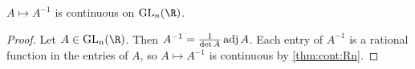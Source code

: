 \begin{proposition*} \label{thm:inv-cont}
    $A \mapsto A^{-1}$ is continuous on $\GL_n(\R)$.
\end{proposition*}
\begin{proof}
    Let $A \in \GL_n(\R)$.
    Then $A^{-1} = \frac1{\det A} \operatorname{adj} A$.
    Each entry of $A^{-1}$ is a rational function in the entries of $A$,
    so $A \mapsto A^{-1}$ is continuous by \cref{thm:cont:Rn}.
\end{proof}
